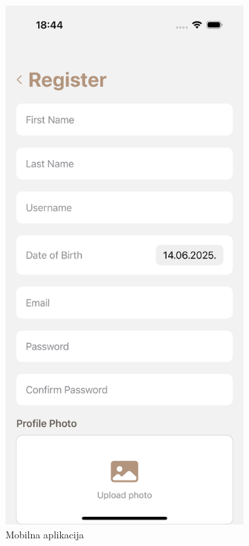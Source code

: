 \begin{figure}[H]
  \centering
  \begin{subfigure}{.5\textwidth}
    \centering
    \includegraphics[width=0.7\linewidth]{images/implementacija/register.png}
    \caption{Mobilna aplikacija}
    \label{fig:registracija1}
  \end{subfigure}%
  \begin{subfigure}{.5\textwidth}
    \centering

\end{subfigure}
\end{figure}
